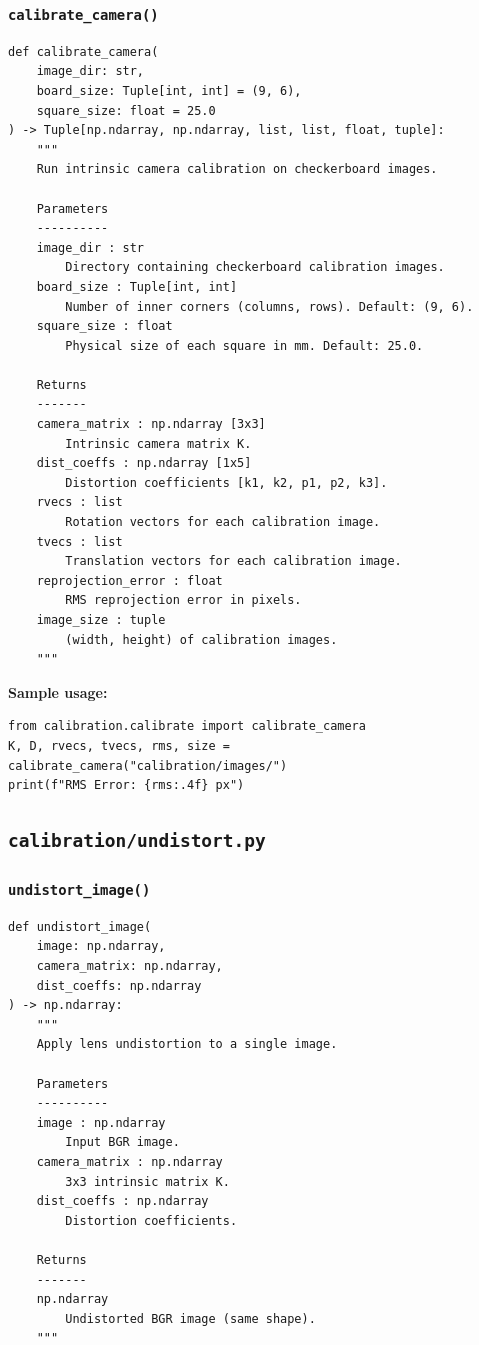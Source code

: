 \documentclass[12pt, a4paper, twoside]{report}
\begin{document}
\subsubsection{\texttt{calibrate\_camera()}}
\begin{lstlisting}[style=pythonstyle]
def calibrate_camera(
    image_dir: str,
    board_size: Tuple[int, int] = (9, 6),
    square_size: float = 25.0
) -> Tuple[np.ndarray, np.ndarray, list, list, float, tuple]:
    """
    Run intrinsic camera calibration on checkerboard images.

    Parameters
    ----------
    image_dir : str
        Directory containing checkerboard calibration images.
    board_size : Tuple[int, int]
        Number of inner corners (columns, rows). Default: (9, 6).
    square_size : float
        Physical size of each square in mm. Default: 25.0.

    Returns
    -------
    camera_matrix : np.ndarray [3x3]
        Intrinsic camera matrix K.
    dist_coeffs : np.ndarray [1x5]
        Distortion coefficients [k1, k2, p1, p2, k3].
    rvecs : list
        Rotation vectors for each calibration image.
    tvecs : list
        Translation vectors for each calibration image.
    reprojection_error : float
        RMS reprojection error in pixels.
    image_size : tuple
        (width, height) of calibration images.
    """
\end{lstlisting}

\textbf{Sample usage:}
\begin{lstlisting}[style=pythonstyle]
from calibration.calibrate import calibrate_camera
K, D, rvecs, tvecs, rms, size = calibrate_camera("calibration/images/")
print(f"RMS Error: {rms:.4f} px")
\end{lstlisting}

\subsection{\texttt{calibration/undistort.py}}

\subsubsection{\texttt{undistort\_image()}}
\begin{lstlisting}[style=pythonstyle]
def undistort_image(
    image: np.ndarray,
    camera_matrix: np.ndarray,
    dist_coeffs: np.ndarray
) -> np.ndarray:
    """
    Apply lens undistortion to a single image.

    Parameters
    ----------
    image : np.ndarray
        Input BGR image.
    camera_matrix : np.ndarray
        3x3 intrinsic matrix K.
    dist_coeffs : np.ndarray
        Distortion coefficients.

    Returns
    -------
    np.ndarray
        Undistorted BGR image (same shape).
    """
\end{lstlisting}
\end{document}
